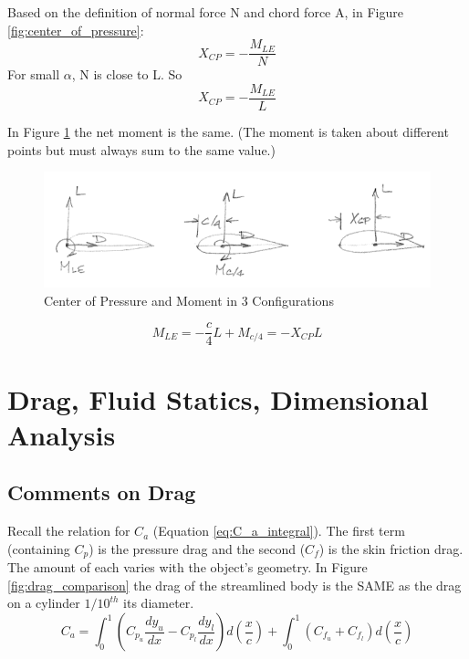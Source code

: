 \documentclass[draft=false, titlepage]{article}
\begin{document}
Based on the definition of normal force N and chord force A, in Figure \ref{fig:center_of_pressure}:
\begin{equation}
    X_{CP} = -\frac{M_{LE}}{N}
\end{equation}
For small $\alpha$, N is close to L. So
\begin{equation}
    X_{CP} = -\frac{M_{LE}}{L}
\end{equation}

In Figure \ref{fig:center_of_pressure2} the net moment is the same. (The moment is taken about different points but must always sum to the same value.)

\begin{figure}[ht]
    \centering
    \includegraphics[width=0.9\linewidth]{Figures/center_of_pressure_2.PNG}
    \caption{Center of Pressure and Moment in 3 Configurations}
    \label{fig:center_of_pressure2}
\end{figure}

\begin{equation}
    M_{LE} = -\frac{c}{4}L + M_{c/4} = -X_{CP}L
\end{equation}

\section{Drag, Fluid Statics, Dimensional Analysis}
\subsection{Comments on Drag}
Recall the relation for $C_a$ (Equation \ref{eq:C_a_integral}). The first term (containing $C_p$) is the pressure drag and the second ($C_f$) is the skin friction drag. The amount of each varies with the object's geometry. In Figure \ref{fig:drag_comparison} the drag of the streamlined body is the SAME as the drag on a cylinder $1/10^{th}$ its diameter.
\begin{equation}
    C_a = \int_0^1(C_{p_u}\frac{dy_u}{dx} - C_{p_l}\frac{dy_l}{dx})d(\frac{x}{c}) + \int_0^1(C_{f_u} + C_{f_l})d(\frac{x}{c})
    \label{eq:C_a_integral}
\end{equation}
\end{document}
